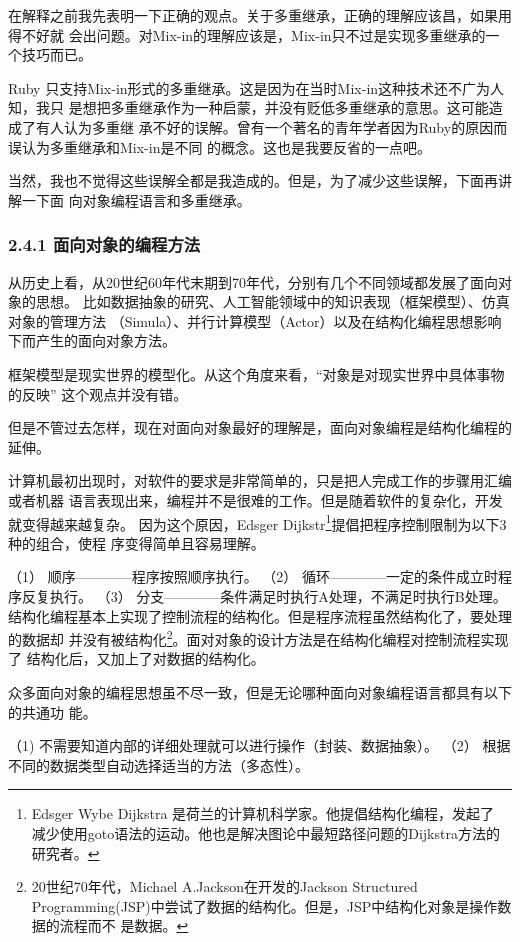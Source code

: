 \documentclass[11pt]{ctexart}
\begin{document}
在解释之前我先表明一下正确的观点。关于多重继承，正确的理解应该昌，如果用得不好就
会出问题。对Mix-in的理解应该是，Mix-in只不过是实现多重继承的一个技巧而已。

Ruby 只支持Mix-in形式的多重继承。这是因为在当时Mix-in这种技术还不广为人知，我只
是想把多重继承作为一种启蒙，并没有贬低多重继承的意思。这可能造成了有人认为多重继
承不好的误解。曾有一个著名的青年学者因为Ruby的原因而误认为多重继承和Mix-in是不同
的概念。这也是我要反省的一点吧。

当然，我也不觉得这些误解全都是我造成的。但是，为了减少这些误解，下面再讲解一下面
向对象编程语言和多重继承。
\subsubsection{2.4.1 面向对象的编程方法}
\label{sec:org5450f71}
从历史上看，从20世纪60年代末期到70年代，分别有几个不同领域都发展了面向对象的思想。
比如数据抽象的研究、人工智能领域中的知识表现（框架模型）、仿真对象的管理方法
（Simula）、并行计算模型（Actor）以及在结构化编程思想影响下而产生的面向对象方法。

框架模型是现实世界的模型化。从这个角度来看，“对象是对现实世界中具体事物的反映”
这个观点并没有错。

但是不管过去怎样，现在对面向对象最好的理解是，面向对象编程是结构化编程的延伸。

计算机最初出现时，对软件的要求是非常简单的，只是把人完成工作的步骤用汇编或者机器
语言表现出来，编程并不是很难的工作。但是随着软件的复杂化，开发就变得越来越复杂。
因为这个原因，Edsger Dijkstr\footnote{Edsger Wybe Dijkstra 是荷兰的计算机科学家。他提倡结构化编程，发起了
减少使用goto语法的运动。他也是解决图论中最短路径问题的Dijkstra方法的研究者。}提倡把程序控制限制为以下3种的组合，使程
序变得简单且容易理解。

    （1） 顺序————程序按照顺序执行。
    （2） 循环————一定的条件成立时程序反复执行。
    （3） 分支————条件满足时执行A处理，不满足时执行B处理。
结构化编程基本上实现了控制流程的结构化。但是程序流程虽然结构化了，要处理的数据却
    并没有被结构化\footnote{20世纪70年代，Michael A.Jackson在开发的Jackson Structured
Programming(JSP)中尝试了数据的结构化。但是，JSP中结构化对象是操作数据的流程而不
是数据。}。面对对象的设计方法是在结构化编程对控制流程实现了
    结构化后，又加上了对数据的结构化。

众多面向对象的编程思想虽不尽一致，但是无论哪种面向对象编程语言都具有以下的共通功
能。

（1) 不需要知道内部的详细处理就可以进行操作（封装、数据抽象）。
（2） 根据不同的数据类型自动选择适当的方法（多态性）。
\end{document}
